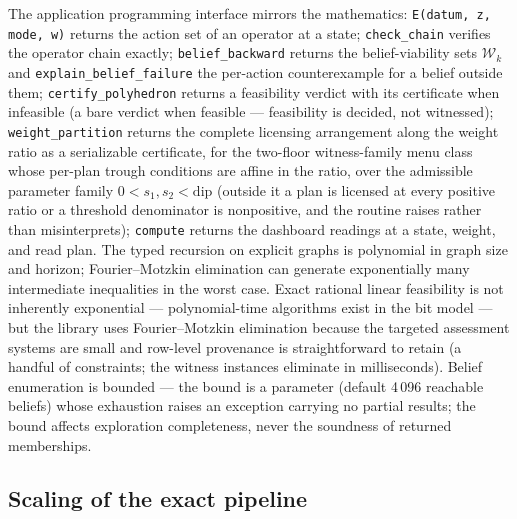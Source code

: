 \documentclass[3p,11pt]{elsarticle}
\begin{document}
The application programming interface mirrors the mathematics:
\texttt{E(datum, z, mode, w)} returns the action set of an operator at a
state; \texttt{check\_chain} verifies the operator chain exactly;
\texttt{belief\_backward} returns the belief-viability sets
$\mathcal{W}_k$ and \texttt{explain\_belief\_failure} the per-action
counterexample for a belief outside them; \texttt{certify\_polyhedron}
returns a feasibility verdict with its certificate when infeasible (a
bare verdict when feasible --- feasibility is decided, not witnessed);
\texttt{weight\_partition} returns the complete licensing arrangement along
the weight ratio as a serializable certificate, for the two-floor
witness-family menu class whose per-plan trough conditions are affine in
the ratio, over the admissible parameter family $0 < s_1, s_2 <
\mathrm{dip}$ (outside it a plan is licensed at every positive ratio or
a threshold denominator is nonpositive, and the routine raises rather
than misinterprets);
\texttt{compute} returns the dashboard readings at a
state, weight, and read plan. The typed recursion on explicit graphs is
polynomial in graph size and horizon; Fourier--Motzkin elimination can
generate exponentially many intermediate inequalities in the worst case.
Exact rational linear feasibility is not inherently exponential ---
polynomial-time algorithms exist in the bit model --- but the library
uses Fourier--Motzkin elimination because the targeted assessment systems
are small and row-level provenance is straightforward to retain (a
handful of constraints; the witness instances eliminate in milliseconds). Belief enumeration is bounded --- the bound is a parameter
(default 4\,096 reachable beliefs) whose exhaustion raises an exception
carrying no partial results; the bound affects exploration completeness,
never the soundness of returned memberships.

\subsection{Scaling of the exact pipeline}\label{sec:scaling}
\end{document}
